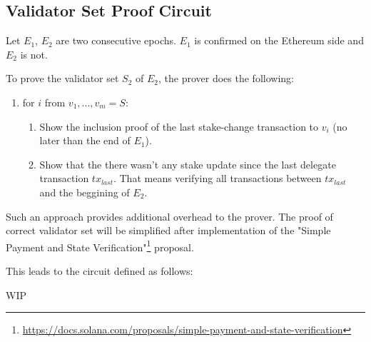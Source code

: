 \subsection{Validator Set Proof Circuit}

Let $E_1$, $E_2$ are two consecutive epochs. $E_1$ is confirmed on the Ethereum side and $E_2$ is not.

To prove the validator set $S_2$ of $E_2$, the prover does the following:
\begin{enumerate}
	\item for $i$ from ${v_1, ..., v_m} = S$:
	\begin{enumerate}
		\item Show the inclusion proof of the last stake-change transaction to $v_i$ (no later than the end of $E_1$).
		\item Show that the there wasn't any stake update since the last delegate transaction $tx_{last}$.
		That means verifying all transactions between $tx_{last}$ and the beggining of $E_2$.
	\end{enumerate}
\end{enumerate}

Such an approach provides additional overhead to the prover.
The proof of correct validator set will be simplified after implementation of the "Simple Payment and State Verification"\footnote{\url{https://docs.solana.com/proposals/simple-payment-and-state-verification}} proposal.

This leads to the circuit defined as follows:

WIP
